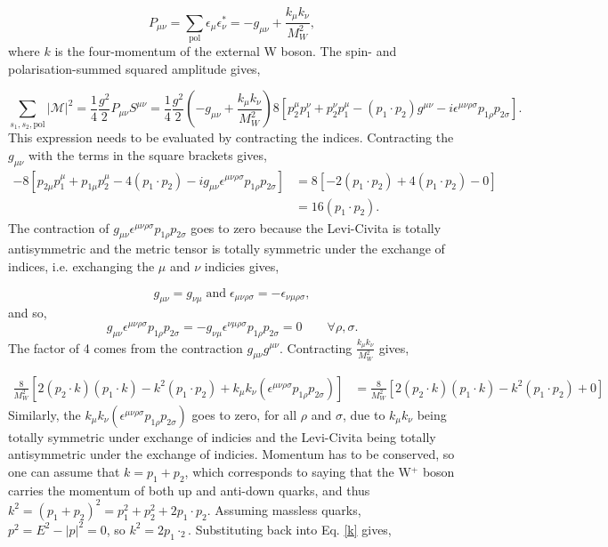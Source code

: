 \documentclass[a4paper,11pt]{article}
\begin{document}
\begin{equation}
	P_{\mu\nu}= \sum_\text{pol} \epsilon_\mu \epsilon_\nu^*=  -g_{\mu\nu} + \frac{k_\mu k_\nu}{M_W^2},
\end{equation}
where $k$ is the four-momentum of the external W boson. The spin- and  polarisation-summed squared amplitude gives,

\begin{equation}\label{spin_pol_square_amp}
	\sum_{s_1, s_2, \text{pol}} |\mathcal{M}|^2=  \frac{1}{4} \frac{g^2}{2} P_{\mu\nu}S^{\mu\nu}= \frac{1}{4} \frac{g^2}{2} \left(-g_{\mu\nu} + \frac{k_\mu k_\nu}{M_W^2}\right)8[p_2^\mu p_1^\nu + p_2^\nu p_1^\mu - (p_1 \cdot p_2) g^{\mu \nu} - i \epsilon^{\mu \nu \rho \sigma}p_{1\rho}p_{2\sigma}].
\end{equation}
This expression needs to be evaluated by contracting the indices. Contracting the $g_{\mu\nu}$ with the terms in the square brackets gives,
\begin{equation}
	\begin{aligned}
		-8[p_{2\mu}p_1^\mu + p_{1\mu}p_2^\mu -4(p_1 \cdot p_2) -ig_{\mu\nu}\epsilon^{\mu \nu \rho \sigma}p_{1\rho}p_{2\sigma}] &= 8[-2(p_1 \cdot p_2) + 4(p_1 \cdot p_2)- 0] \\
		&= 16(p_1 \cdot p_2).
	\end{aligned}
\end{equation}
 The contraction of $g_{\mu\nu}\epsilon^{\mu \nu \rho \sigma}p_{1\rho}p_{2\sigma}$ goes to zero because the Levi-Civita is totally antisymmetric and the metric tensor is totally symmetric under the exchange of indices, i.e. exchanging the $\mu$ and $\nu$ indicies gives,
 
 $$g_{\mu\nu} = g_{\nu\mu} \; \text{and}\; \epsilon_{\mu \nu \rho \sigma} = - \epsilon_{\nu \mu \rho \sigma},$$ 
 and so, 
 $$ g_{\mu\nu}\epsilon^{\mu \nu \rho \sigma}p_{1\rho}p_{2\sigma} = - g_{\nu\mu}\epsilon^{\nu \mu \rho \sigma}p_{1\rho}p_{2\sigma}= 0 \qquad \forall \rho,\sigma. $$
  The factor of 4 comes from the contraction $g_{\mu\nu}g^{\mu\nu}$. Contracting $\frac{k_\mu k_\nu}{M_W^2}$ gives,
 
 \begin{equation}\label{k}
 	\begin{aligned}
		\frac{8}{M_W^2}[2(p_2 \cdot k)(p_1 \cdot k ) - k^2 (p_1 \cdot p_2)+ k_\mu k_\nu (\epsilon^{\mu \nu \rho \sigma}p_{1\rho}p_{2\sigma})] &=  \frac{8}{M_W^2}[2(p_2 \cdot k)(p_1 \cdot k ) - k^2 (p_1 \cdot p_2)+ 0] 
 	\end{aligned}
 \end{equation}
Similarly, the $k_\mu k_\nu (\epsilon^{\mu \nu \rho \sigma}p_{1\rho}p_{2\sigma})$ goes to zero, for all $\rho$ and $\sigma$, due to $k_\mu k_\nu$ being totally symmetric under exchange of indicies and the Levi-Civita being totally antisymmetric under the exchange of indicies. Momentum has to be conserved, so one can assume that $k = p_1 + p_2$, which corresponds to saying that the W$^+$ boson carries the momentum of both up and anti-down quarks, and thus $k^2 = ( p_1 + p_2)^2 = p_1^2 + p_2^2 +2p_1\cdot p_2$. Assuming massless quarks, $p^2 = E^2 - |p|^2 = 0 $, so $k^2 = 2p_1\cdotp_2$. Substituting back into Eq. \ref{k} gives,
\end{document}
